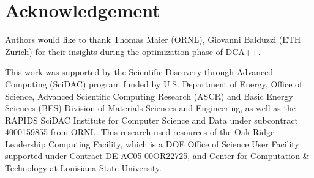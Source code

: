 \section*{Acknowledgement}
\label{sec:ack}

Authors would like to thank Thomas Maier (ORNL), Giovanni Balduzzi (ETH Zurich) for their insights during the optimization phase of DCA++. 

This work was supported by the Scientific Discovery through Advanced Computing (SciDAC) program funded by U.S. Department of Energy, Office of Science, Advanced Scientific Computing Research (ASCR) and Basic Energy Sciences (BES) Division of Materials Sciences and Engineering, as well as the RAPIDS SciDAC Institute for Computer Science and Data under subcontract 4000159855 from ORNL. This research used resources of the Oak Ridge Leadership Computing Facility, which is a DOE Office of Science User Facility supported under Contract DE-AC05-00OR22725, and Center for Computation \& Technology at Louisiana State University. 